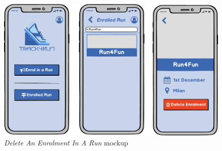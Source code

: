 \begin{figure}
\begin{center}
  \includegraphics[width=\textwidth]{img/mockup/DeleteEnrolment.png}
  \hspace{0.05\linewidth}
  \centering
  \caption{\textit{Delete An Enrolment In A Run} mockup}
  \label{img:deleteEnrolmentMockup}
\end{center}
\end{figure}
